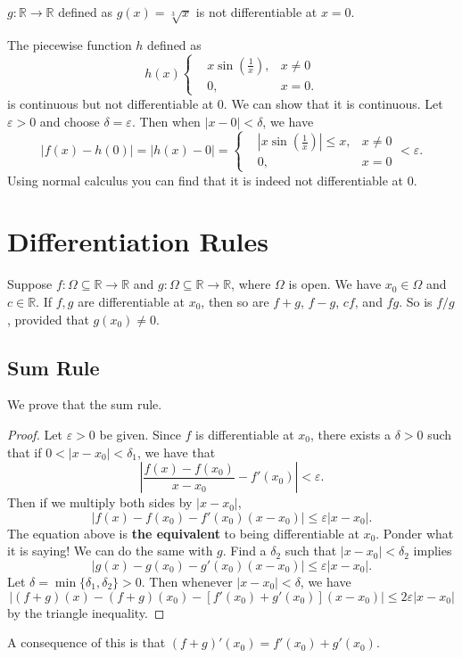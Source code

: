 \documentclass[11pt]{article}
\theoremstyle{definition}
\newcommand{\R}{\mathbb{R}}                      %
\begin{document}
\ex $g:\R\to\R$ defined as $g(x)=\sqrt[3]{x}$ is not differentiable at $x=0$.

\ex The piecewise function $h$ defined as 
$$
h(x)\left\{\begin{aligned}
&x\sin{\left(\frac{1}{x}\right)},&x\neq0\\
&0,&x=0.
\end{aligned}\right.
$$
is continuous but not differentiable at 0. We can show that it is continuous. Let $\varepsilon>0$ and choose $\delta=\varepsilon$. Then when $|x-0|<\delta$, we have 
$$
|f(x)-h(0)|=|h(x)-0|=\left\{\begin{aligned}
    &\left|x\sin{\left(\frac{1}{x}\right)}\right|\leq x,&x\neq 0\\
    &0,&x=0
\end{aligned}\right.<\varepsilon.
$$
Using normal calculus you can find that it is indeed not differentiable at 0.

\section{Differentiation Rules}
Suppose $f:\Omega\subseteq \R\to\R$ and $g:\Omega\subseteq \R\to \R$, where $\Omega$ is open. We have $x_0\in\Omega$ and $c\in \R$. If $f,g$ are differentiable at $x_0$, then so are $f+g$, $f-g$, $cf$, and $fg$. So is $f/g$, provided that $g(x_0)\neq 0$.

\subsection{Sum Rule}
We prove that the sum rule.
\begin{proof}
    Let $\varepsilon>0$ be given. Since $f$ is differentiable at $x_0$, there exists a $\delta>0$ such that if $0<|x-x_0|<\delta_1$, we have that 
    $$
    \left|\frac{f(x)-f(x_0)}{x-x_0}-f'(x_0)\right|<\varepsilon.
    $$
    Then if we multiply both sides by $|x-x_0|$,
    $$
    |f(x)-f(x_0)-f'(x_0)(x-x_0)|\leq\varepsilon |x-x_0|.
    $$
    The equation above is \textbf{the equivalent} to being differentiable at $x_0$. Ponder what it is saying! We can do the same with $g$. Find a $\delta_2$ such that $|x-x_0|<\delta_2$ implies
    $$
    |g(x)-g(x_0)-g'(x_0)(x-x_0)|\leq\varepsilon |x-x_0|.
    $$
    Let $\delta=\min\{\delta_1,\delta_2\}>0$. Then whenever $|x-x_0|<\delta$, we have
    $$
    |(f+g)(x)-(f+g)(x_0)-[f'(x_0)+g'(x_0)](x-x_0)|\leq 2\varepsilon|x-x_0|
    $$
    by the triangle inequality.
\end{proof}
\note A consequence of this is that $(f+g)'(x_0)=f'(x_0)+g'(x_0)$.
\end{document}
